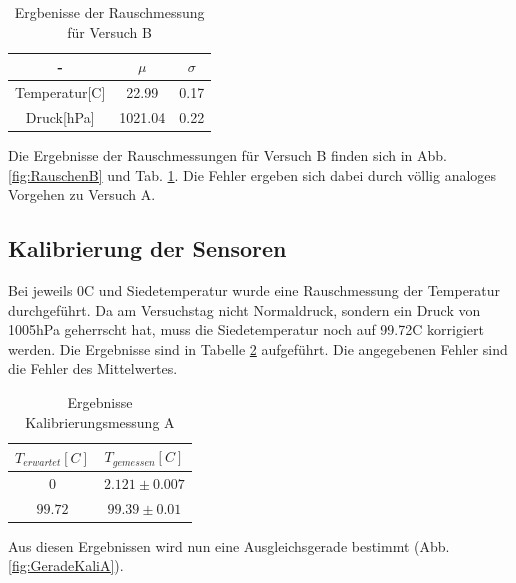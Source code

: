\documentclass[12pt,a4paper]{article}
\begin{document}
\begin{table}[H]
\begin{center}
\begin{tabular}{|c|c|c|}
\hline 
- & $\mu$ & $\sigma$\\ 
\hline 
Temperatur[C] & 22.99 & 0.17 \\ 
\hline 
Druck[hPa] & 1021.04 & 0.22\\ 
\hline 
\end{tabular}
\caption[Tabelle Rauschenmessung B]{Ergbenisse der Rauschmessung für Versuch B}
\label{tab:RauschenB}
\end{center}
\end{table}

Die Ergebnisse der Rauschmessungen für Versuch B finden sich in Abb. \ref{fig:RauschenB} und Tab. \ref{tab:RauschenB}.
Die Fehler ergeben sich dabei durch völlig analoges Vorgehen zu Versuch A.



\subsection{Kalibrierung der Sensoren}

Bei jeweils 0C und Siedetemperatur wurde eine Rauschmessung der Temperatur durchgeführt. Da am Versuchstag nicht Normaldruck, sondern ein Druck von 1005hPa geherrscht hat, muss die Siedetemperatur noch auf 99.72C korrigiert werden. Die Ergebnisse sind in Tabelle \ref{tab:KaliA} aufgeführt. Die angegebenen Fehler sind die Fehler des Mittelwertes.

\begin{table}[H]
\begin{center}
\begin{tabular}{|c|c|}
\hline 
$T_{erwartet}[C]$ & $T_{gemessen}[C]$ \\ 
\hline 
$0$ & $2.121\pm0.007$ \\ %
\hline 
$99.72$ & $99.39\pm0.01$ \\ 
\hline 
\end{tabular}
\caption[Ergebnisse Kalibrierungsmessung A]{Ergebnisse Kalibrierungsmessung A} 
\label{tab:KaliA}
\end{center}
\end{table}

Aus diesen Ergebnissen wird nun eine Ausgleichsgerade bestimmt (Abb.\ref{fig:GeradeKaliA}).
\end{document}
